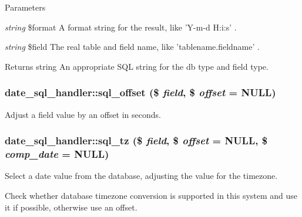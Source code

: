 \begin{DoxyParams}{Parameters}
\item[{\em string}]\$format A format string for the result, like 'Y-\/m-\/d H:i:s' . \item[{\em string}]\$field The real table and field name, like 'tablename.fieldname' .\end{DoxyParams}
\begin{DoxyReturn}{Returns}
string An appropriate SQL string for the db type and field type. 
\end{DoxyReturn}
\hypertarget{classdate__sql__handler_a86e10af9491fe99da8c8c6239620f3de}{
\subsubsection[{sql\_\-offset}]{\setlength{\rightskip}{0pt plus 5cm}date\_\-sql\_\-handler::sql\_\-offset (\$ {\em field}, \/  \$ {\em offset} = {\ttfamily NULL})}}
\label{classdate__sql__handler_a86e10af9491fe99da8c8c6239620f3de}
Adjust a field value by an offset in seconds. \hypertarget{classdate__sql__handler_a6e3a20d322159d5c704b5c06bbf2501b}{
\subsubsection[{sql\_\-tz}]{\setlength{\rightskip}{0pt plus 5cm}date\_\-sql\_\-handler::sql\_\-tz (\$ {\em field}, \/  \$ {\em offset} = {\ttfamily NULL}, \/  \$ {\em comp\_\-date} = {\ttfamily NULL})}}
\label{classdate__sql__handler_a6e3a20d322159d5c704b5c06bbf2501b}
Select a date value from the database, adjusting the value for the timezone.

Check whether database timezone conversion is supported in this system and use it if possible, otherwise use an offset.



